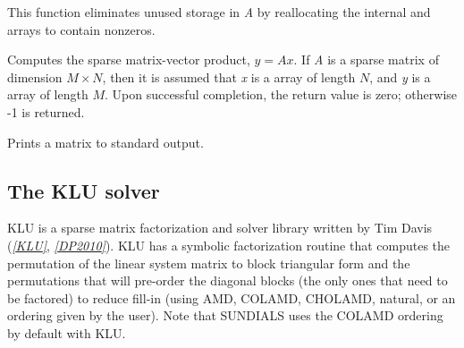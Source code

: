 \documentclass[letterpaper,10pt,english]{sphinxmanual}
\begin{document}

\begin{fulllineitems}
\label{linear_solvers/SLS:c.ReallocSparseMat}
This function eliminates unused storage in \emph{A} by reallocating
the internal  and  arrays to contain
 nonzeros.

\end{fulllineitems}


\begin{fulllineitems}
\label{linear_solvers/SLS:c.SlsMatvec}
Computes the sparse matrix-vector product, \(y=Ax\).  If \emph{A}
is a sparse matrix of dimension \(M\times N\), then it is assumed that \emph{x}
is a  array of  length \(N\), and \emph{y} is a
 array of length \(M\). Upon successful completion, the
return value is zero; otherwise -1 is returned.

\end{fulllineitems}


\begin{fulllineitems}
\label{linear_solvers/SLS:c.PrintSparseMat}
Prints a {\hyperref[linear_solvers/SLS:c.SlsMat]{\emph{}}} matrix to standard output.

\end{fulllineitems}



\subsection{The KLU solver}
\label{linear_solvers/SLS:the-klu-solver}
KLU is a sparse matrix factorization and solver library written by Tim
Davis (\label{linear_solvers/SLS:id1}{\hyperref[References:klu]{\emph{{[}KLU{]}}}}, \label{linear_solvers/SLS:id2}{\hyperref[References:dp2010]{\emph{{[}DP2010{]}}}}).   KLU has a symbolic factorization routine
that computes the permutation of the linear system matrix to block
triangular form and the permutations that will pre-order the diagonal
blocks (the only ones that need to be factored) to reduce fill-in
(using AMD, COLAMD, CHOLAMD, natural, or an ordering given by the
user).  Note that SUNDIALS uses the COLAMD ordering by default with
KLU.
\end{document}
